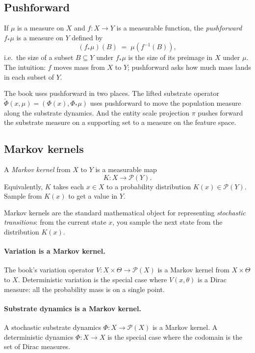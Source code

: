 \subsection*{Pushforward}

If $\mu$ is a measure on $X$ and $f : X \to Y$ is a measurable
function, the \emph{pushforward} $f_* \mu$ is a measure on $Y$
defined by
\[
  (f_*\mu)(B) \;=\; \mu(f^{-1}(B)),
\]
i.e.\ the size of a subset $B \subseteq Y$ under $f_*\mu$ is the
size of its preimage in $X$ under $\mu$. The intuition: $f$ moves
mass from $X$ to $Y$; pushforward asks how much mass lands in each
subset of $Y$.

The book uses pushforward in two places. The lifted substrate
operator $\widetilde\Phi(x, \mu) = (\Phi(x), \Phi_* \mu)$ uses
pushforward to move the population measure along the substrate
dynamics. And the entity scale projection $\pi$ pushes forward the
substrate measure on a supporting set to a measure on the feature
space.

\subsection*{Markov kernels}

A \emph{Markov kernel} from $X$ to $Y$ is a measurable map
\[
  K : X \to \mathcal{P}(Y).
\]
Equivalently, $K$ takes each $x \in X$ to a probability
distribution $K(x) \in \mathcal{P}(Y)$. Sample from $K(x)$ to get a
value in $Y$.

Markov kernels are the standard mathematical object for representing
\emph{stochastic transitions}: from the current state $x$, you
sample the next state from the distribution $K(x)$.

\paragraph{Variation is a Markov kernel.} The book's variation
operator $V : X \times \Theta \to \mathcal{P}(X)$ is a Markov kernel
from $X \times \Theta$ to $X$. Deterministic variation is the
special case where $V(x, \theta)$ is a Dirac measure: all the
probability mass is on a single point.

\paragraph{Substrate dynamics is a Markov kernel.} A stochastic
substrate dynamics $\Phi : X \to \mathcal{P}(X)$ is a Markov kernel.
A deterministic dynamics $\Phi : X \to X$ is the special case where
the codomain is the set of Dirac measures.

